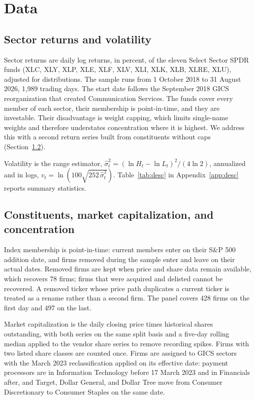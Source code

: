 \documentclass[11pt]{article}
\begin{document}
\section{Data}\label{sec:data}

\subsection{Sector returns and volatility}

Sector returns are daily log returns, in percent, of the eleven Select Sector SPDR funds (XLC, XLY, XLP, XLE, XLF, XLV, XLI, XLK, XLB, XLRE, XLU), adjusted for distributions. The sample runs from 1 October 2018 to 31 August 2026, 1,989 trading days. The start date follows the September 2018 GICS reorganization that created Communication Services. The funds cover every member of each sector, their membership is point-in-time, and they are investable. Their disadvantage is weight capping, which limits single-name weights and therefore understates concentration where it is highest. We address this with a second return series built from constituents without caps (Section~\ref{sec:const}).

Volatility is the \citet{parkinson1980} range estimator, $\hat\sigma^2_t = (\ln H_t - \ln L_t)^2/(4\ln 2)$, annualized and in logs, $v_t = \ln(100\sqrt{252\,\hat\sigma^2_t})$. Table~\ref{tab:desc} in Appendix~\ref{app:desc} reports summary statistics.

\subsection{Constituents, market capitalization, and concentration}\label{sec:const}

Index membership is point-in-time: current members enter on their S\&P 500 addition date, and firms removed during the sample enter and leave on their actual dates. Removed firms are kept when price and share data remain available, which recovers 78 firms; firms that were acquired and delisted cannot be recovered. A removed ticker whose price path duplicates a current ticker is treated as a rename rather than a second firm. The panel covers 428 firms on the first day and 497 on the last.

Market capitalization is the daily closing price times historical shares outstanding, with both series on the same split basis and a five-day rolling median applied to the vendor share series to remove recording spikes. Firms with two listed share classes are counted once. Firms are assigned to GICS sectors with the March 2023 reclassification applied on its effective date: payment processors are in Information Technology before 17 March 2023 and in Financials after, and Target, Dollar General, and Dollar Tree move from Consumer Discretionary to Consumer Staples on the same date.
\end{document}
